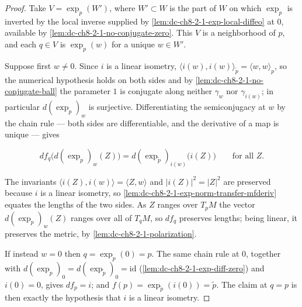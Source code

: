 \begin{proof}

\sketch
  Take $V=\exp_p(W')$, where $W'\subset W$ is the part of $W$ on which $\exp_p$ is inverted by the
  local inverse supplied by \cref{lem:dc-ch8-2-1-exp-local-diffeo} at $0$, available by
  \cref{lem:dc-ch8-2-1-no-conjugate-zero}. This $V$ is a neighborhood of $p$, and each $q\in V$ is
  $\exp_p(w)$ for a unique $w\in W'$.

  Suppose first $w\neq0$. Since $i$ is a linear isometry, $\langle i(w),i(w)\rangle_{\tilde p}
  =\langle w,w\rangle_p$, so the numerical hypothesis holds on both sides and by
  \cref{lem:dc-ch8-2-1-no-conjugate-ball} the parameter $1$ is conjugate along neither $\gamma_w$
  nor $\gamma_{i(w)}$; in particular $d(\exp_p)_w$ is surjective. Differentiating the semiconjugacy
  at $w$ by the chain rule --- both sides are differentiable, and the derivative of a map is unique
  --- gives

  $$
  df_q\big(d(\exp_p)_w(Z)\big)=d(\exp_{\tilde p})_{i(w)}\big(i(Z)\big)\qquad\text{for all }Z .
  $$

  The invariants $\langle i(Z),i(w)\rangle=\langle Z,w\rangle$ and $|i(Z)|^2=|Z|^2$ are preserved
  because $i$ is a linear isometry, so \cref{lem:dc-ch8-2-1-exp-norm-transfer-mfderiv} equates the
  lengths of the two sides. As $Z$ ranges over $T_pM$ the vector $d(\exp_p)_w(Z)$ ranges over all of
  $T_qM$, so $df_q$ preserves lengths; being linear, it preserves the metric, by
  \cref{lem:dc-ch8-2-1-polarization}.

  If instead $w=0$ then $q=\exp_p(0)=p$. The same chain rule at $0$, together with
  $d(\exp_p)_0=d(\exp_{\tilde p})_0=\mathrm{id}$ (\cref{lem:dc-ch8-2-1-exp-diff-zero}) and
  $i(0)=0$, gives $df_p=i$; and $f(p)=\exp_{\tilde p}(i(0))=\tilde p$. The claim at $q=p$ is then
  exactly the hypothesis that $i$ is a linear isometry.
\end{proof}

